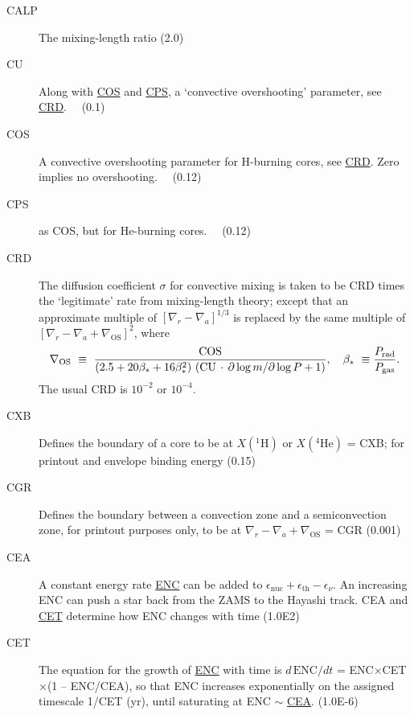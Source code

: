 \begin{description}
\item[CALP]\hypertarget{calp}{} The mixing-length ratio (2.0)
\item[CU]\hypertarget{cu}{} Along with \hyperlink{cos}{COS} and \hyperlink{cps}{CPS}, a `convective overshooting' parameter, see \hyperlink{crd}{CRD}. \ \ (0.1)
\item[COS]\hypertarget{cos}{} A convective overshooting parameter for H-burning cores, see \hyperlink{crd}{CRD}.  Zero implies no overshooting. \ \ (0.12)
\item[CPS]\hypertarget{cps}{} as COS, but for He-burning cores. \ \ (0.12)
\item[CRD]\hypertarget{crd}{} The diffusion coefficient $\sigma$ for convective mixing is taken to be CRD times the `legitimate' rate from 
  mixing-length theory; except that an approximate multiple of $\left[\nabla_r-\nabla_a\right]^{1/3}$ is replaced 
  by the same multiple of $\left[\nabla_r-\nabla_a+\nabla_\mathrm{OS}\right]^2$, where
  $$\nabla_\mathrm{OS}\ \equiv\ {\mathrm{COS}\over \left(2.5+20\beta_*+16\beta_*^2\right) \,\left(\mathrm{CU}\,\cdot\,\partial\log m/\partial\log P+1\right)}, ~~~ \beta_*\ \equiv{P_\mathrm{rad} \over P_\mathrm{gas}}.$$
  The usual CRD is $10^{-2}$ or $10^{-4}$.
\item[CXB]\hypertarget{cxb}{} Defines the boundary of a core to be at $X(^1\mathrm{H})$ or $X(^4\mathrm{He})$ = CXB; for printout and envelope binding energy  (0.15)
\item[CGR]\hypertarget{cgr}{} Defines the boundary between a convection zone and a semiconvection zone, for printout purposes only, to be at $\nabla_r - \nabla_a + \nabla_\mathrm{OS}$ = CGR (0.001)
\item[CEA]\hypertarget{cea}{} A constant energy rate \hyperlink{enc}{ENC} can be added to 
  $\epsilon_\mathrm{nuc}+\epsilon_\mathrm{th}-\epsilon_\nu$. An increasing ENC can push a star back from the
  ZAMS to the Hayashi track. CEA and \hyperlink{cet}{CET} determine how ENC changes with time  (1.0E2)
\item[CET]\hypertarget{cet}{} The equation for the growth of \hyperlink{enc}{ENC} with time is $d\,\mathrm{ENC}/dt$ = ENC$\times$CET$\times$(1 -- ENC/CEA), so that ENC 
  increases exponentially on the assigned timescale 1/CET (yr), until saturating at  ENC $\sim$ \hyperlink{cea}{CEA}. (1.0E-6)
\end{description}



